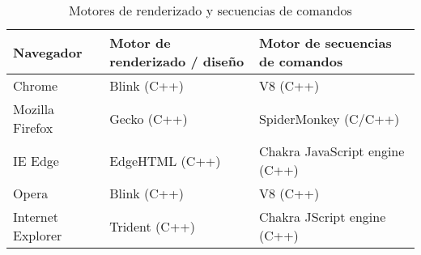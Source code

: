 \begin{table}[H]
  \renewcommand{\arraystretch}{1.5}
  \centering
  \scriptsize
  \begin{tabular}{ |p{2cm}||p{5cm}|p{5cm}|  }
    \hline
        Navegador
      & Motor de \gls{renderizado} / diseño
      & Motor de secuencias de comandos \\
    \hline
        Chrome
      & Blink (C++)
      & V8 (C++) \\
    \hline
    \hline
        Mozilla Firefox
      & Gecko (C++)
      & SpiderMonkey (C/C++) \\
    \hline
    \hline
        IE Edge
      & EdgeHTML (C++)
      & Chakra JavaScript engine (C++) \\
    \hline
    \hline
    Opera
      & Blink (C++)
      & V8 (C++) \\
    \hline
    Internet Explorer
      & Trident (C++)
      & Chakra JScript engine (C++) \\
    \hline
  \end{tabular}
  \caption{Motores de renderizado y secuencias de comandos}
\end{table}
\vspace{0.8cm}
